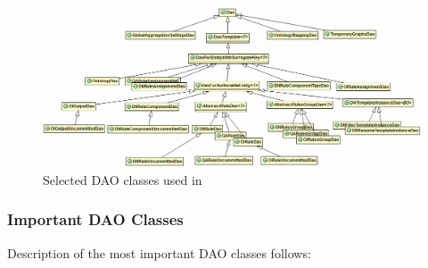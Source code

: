 \begin{figure}[htb]
    \centering
    \includegraphics[width=1.05\textwidth]{images/dia-fe-dao.png}
    \caption{Selected DAO classes used in \FE}
	\label{fig:feDAO}
\end{figure}

\subsubsection{Important DAO Classes}
Description of the most important DAO classes follows:

